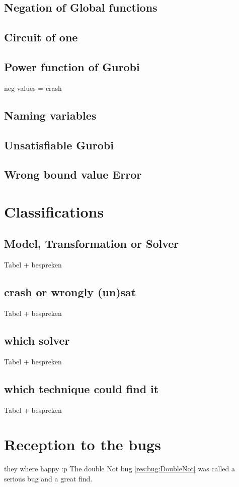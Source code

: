 \subsection{Negation of Global functions}
\subsection{Circuit of one}
\subsection{Power function of Gurobi}
neg values = crash
\subsection{Naming variables}
\subsection{Unsatisfiable Gurobi}
\subsection{Wrong bound value Error}


\section{Classifications}
\subsection{Model, Transformation or Solver}
Tabel + bespreken
\subsection{crash or wrongly (un)sat}
Tabel + bespreken
\subsection{which solver}
Tabel + bespreken
\subsection{which technique could find it}
Tabel + bespreken

\section{Reception to the bugs}
they where happy :p
The double Not bug \ref{res:bug:DoubleNot} was called a serious bug and a great find. %

